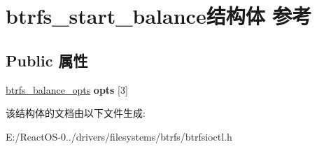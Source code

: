 \hypertarget{structbtrfs__start__balance}{}\section{btrfs\+\_\+start\+\_\+balance结构体 参考}
\label{structbtrfs__start__balance}
\subsection*{Public 属性}
\begin{DoxyCompactItemize}
\item 
\mbox{\label{structbtrfs__start__balance_a18dc5c9e9fd25f561aa5ba76facfe0e4}} 
\hyperlink{structbtrfs__balance__opts}{btrfs\+\_\+balance\+\_\+opts} {\bfseries opts} \mbox{[}3\mbox{]}
\end{DoxyCompactItemize}


该结构体的文档由以下文件生成\+:\begin{DoxyCompactItemize}
\item 
E\+:/\+React\+O\+S-\/0../drivers/filesystems/btrfs/btrfsioctl.\+h\end{DoxyCompactItemize}
